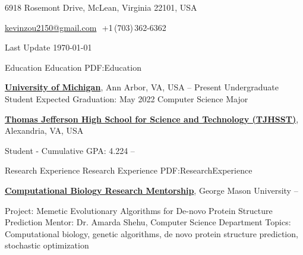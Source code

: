 \documentclass[letterpaper,MMMyyyy,nonstopmode]{style}
\newcommand{\CVAuthor}{Kevin Zou}
\newcommand{\CVNote}{Last Update \today}
\begin{document}

\Title{\CVAuthor}

\begin{SubTitle}
{6918 Rosemont Drive, McLean, Virginia 22101, USA}
\par
\href{mailto:kevinzou2150@gmail.com}{kevinzou2150@gmail.com}
\,\SubBulletSymbol\,+1\,(703)\,362-6362
\par
\CVNote
\end{SubTitle}

\begin{Body}


\Section
{Education}
{Education}
{PDF:Education}

\Entry
\href{https://www.umich.edu/}
{\textbf{University of Michigan}},
Ann Arbor, VA, USA
\hfill
{} -- Present
\Gap
\BulletItem
Undergraduate Student
\hfill
Expected Graduation: May 2022
\BulletItem
Computer Science Major
\Gap

\Entry
\href{https://tjhsst.fcps.edu/}
{\textbf{Thomas Jefferson High School for Science and Technology (TJHSST)}},
Alexandria, VA, USA

\Gap
\BulletItem
Student - Cumulative GPA: 4.224
\hfill
{} --



\Section
{Research Experience}
{Research Experience}
{PDF:ResearchExperience}

\Entry
\href{http://cs.gmu.edu/~ashehu/}
{\textbf{Computational Biology Research Mentorship}},
George Mason University
\hfill
{} -- 

\Gap
\BulletItem
Project:
Memetic Evolutionary Algorithms for De-novo Protein Structure Prediction
\BulletItem
Mentor:
Dr. Amarda Shehu, Computer Science Department
\BulletItem
Topics:
Computational biology, genetic algorithms, de novo protein structure prediction, stochastic optimization

\begin{comment}
\Section
{Publications}
{Publications}
{PDF:Publications}

\SubSection
{Conferences}
{Conferences}
{PDF:Conferences}

\begingroup
\renewcommand{\MaxNumberedItem}{[8888]}


\end{comment}
\end{Body}
\end{document}
